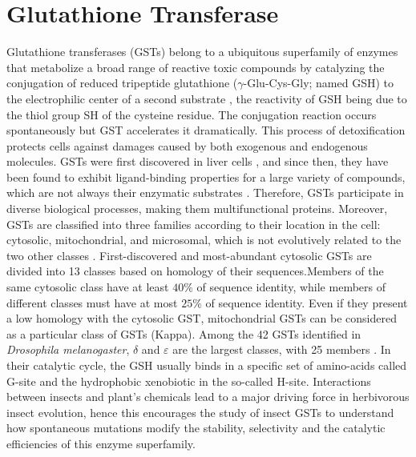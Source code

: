 \section{Glutathione Transferase}
Glutathione transferases (GSTs) belong to a ubiquitous superfamily of enzymes that
metabolize a broad range of reactive toxic compounds by catalyzing the conjugation of reduced tripeptide glutathione ($\gamma$-Glu-Cys-Gly; named GSH) to the electrophilic center of a second substrate \cite{mannervik1985isoenzymes, armstrong1997structure, hayes2005glutathione}, the reactivity of GSH being due to the thiol group SH of the cysteine residue. The conjugation reaction occurs spontaneously but GST accelerates it dramatically. This process of detoxification protects cells against damages caused by both exogenous and endogenous molecules. GSTs were first discovered in liver cells \cite{combes1961liver}, and since then, they have been found to exhibit ligand-binding properties for a large variety of compounds, which are not always their enzymatic substrates \cite{axarli2004characterization}. Therefore, GSTs participate in diverse biological processes, making them multifunctional proteins. Moreover, GSTs are classified into three families according to their location in the cell: cytosolic, mitochondrial, and microsomal, which is not evolutively related to the two other classes \cite{oakley2011glutathione}. First-discovered and most-abundant cytosolic GSTs are divided into 13 classes based on homology of their sequences.Members of the same cytosolic class have at least $40\%$ of sequence identity, while members of different classes must have at most $25\%$ of sequence identity. Even if they present a low homology with the cytosolic GST, mitochondrial GSTs can be considered as a particular class of GSTs (Kappa). Among the 42 GSTs identified in \textit{Drosophila melanogaster}, $\delta$ and $\varepsilon$ are the largest classes, with 25 members \cite{F-Neiers-GSTs}. In their catalytic cycle, the GSH usually binds in a specific set of amino-acids called G-site and the hydrophobic xenobiotic in the so-called H-site. Interactions between insects and plant’s chemicals lead to a major driving force in herbivorous insect evolution, hence this encourages the study of insect GSTs to understand how spontaneous mutations modify the stability, selectivity and the catalytic efficiencies of this enzyme superfamily.
